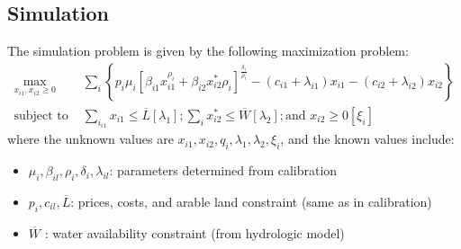 \documentclass[review]{elsarticle}
\begin{document}
\subsection{Simulation}
The simulation problem is given by the following maximization problem:
\begin{equation}\label{eq:econ_simulation}
\begin{split}
    \max _ { x _ { i 1 } , x _ { i 2 } \geq 0 } &  \sum _ { i } \left\{ p _ { i } \mu _ { i } \left[ \beta _ { i 1 } x _ { i 1 } ^ { \rho _ { i } } + \beta _ { i 2 } x _ { i 2 } ^ { * } \rho _ { i } \right] ^ { \frac { \delta _ { i } } { \rho _ { i } } } - \left( c _ { i 1 } + \lambda _ { i 1 } \right) x _ { i 1 } - \left( c _ { i 2 } + \lambda _ { i 2 } \right) x _ { i 2 } \right\} \\
    \text{subject to } & \sum _ { i _ { i 1 } } x _ { i 1 } \leq \overline { L } \left[ \lambda _ { 1 } \right]; \sum _ { i } x _ { i 2 } ^ { * } \leq \overline { W } \left[ \lambda _ { 2 } \right]; \text {and } x _ { i 2 } \geq 0 \left[ \xi _ { i } \right]
\end{split}
\end{equation}
where the unknown values are $x _ { i 1 } , x _ { i 2 } , q _ { i } , \lambda _ { 1 } , \lambda _ { 2 } , \xi _ { i }$, and the known values include:
\begin{itemize}
    \item $\mu _ { i } , \beta _ { i l } , \rho _ { i } , \delta _ { i } , \lambda _ { i l }$: parameters determined from calibration
    \item $p _ { i } , c _ { i l } , \overline { L }$: prices, costs, and arable land constraint (same as in calibration)
    \item $\overline { W }$ : water availability constraint (from hydrologic model)
\end{itemize}
\end{document}
